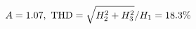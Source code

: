 \documentclass[preview]{standalone}
\begin{document}
\begin{align*}
\special{dvisvgm:raw <g id='unique000'>}A=1.07,\ \text{THD}=\sqrt{H_2^2+H_3^2}/H_1=18.3\%\special{dvisvgm:raw </g>}
\end{align*}
\end{document}
